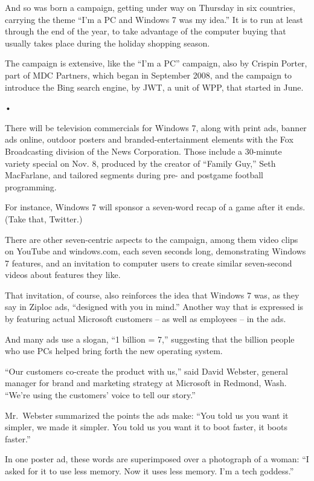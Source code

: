 ﻿\documentclass[12pt]{article}
\begin{document}
And so was born a campaign, getting under way on Thursday in six countries, carrying the theme ``I'm
a PC and Windows 7 was my idea.'' It is to run at least through the end of the year, to take
advantage of the computer buying that usually takes place during the holiday shopping season.

The campaign is extensive, like the ``I'm a PC'' campaign, also by Crispin Porter, part of MDC
Partners, which began in September 2008, and the campaign to introduce the Bing search engine, by
JWT, a unit of WPP, that started in June.

•

There will be television commercials for Windows 7, along with print ads, banner ads online, outdoor
posters and branded-entertainment elements with the Fox Broadcasting division of the News
Corporation. Those include a 30-minute variety special on Nov. 8, produced by the creator of
``Family Guy,'' Seth MacFarlane, and tailored segments during pre- and postgame football
programming.

For instance, Windows 7 will sponsor a seven-word recap of a game after it ends. (Take that,
Twitter.)

There are other seven-centric aspects to the campaign, among them video clips on YouTube and
windows.com, each seven seconds long, demonstrating Windows 7 features, and an invitation to
computer users to create similar seven-second videos about features they like.

That invitation, of course, also reinforces the idea that Windows 7 was, as they say in Ziploc ads,
``designed with you in mind.'' Another way that is expressed is by featuring actual Microsoft
customers -- as well as employees -- in the ads.

And many ads use a slogan, ``1 billion = 7,'' suggesting that the billion people who use PCs helped
bring forth the new operating system.

``Our customers co-create the product with us,'' said David Webster, general manager for brand and
marketing strategy at Microsoft in Redmond, Wash. ``We're using the customers' voice to tell our
story.''

Mr.~Webster summarized the points the ads make: ``You told us you want it simpler, we made it
simpler. You told us you want it to boot faster, it boots faster.''

In one poster ad, these words are superimposed over a photograph of a woman: ``I asked for it to use
less memory. Now it uses less memory. I'm a tech goddess.''
\end{document}
